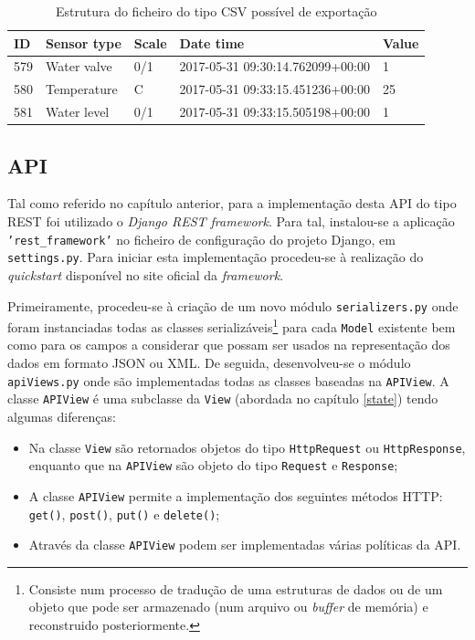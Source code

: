\begin{table}[h]
	\centering

	\begin{tabular}{|l|l|l|l|l|}
		\hline
		ID & Sensor type & Scale & Date time & Value \\ \hline
		579 & Water valve & 0/1 & 2017-05-31 09:30:14.762099+00:00 & 1 \\ \hline
		580 & Temperature & C & 2017-05-31 09:33:15.451236+00:00 & 25 \\ \hline
		581 & Water level & 0/1 & 2017-05-31 09:33:15.505198+00:00 & 1 \\ \hline
	\end{tabular}
	\caption{Estrutura do ficheiro do tipo \acs{CSV} possível de exportação}
	\label{exportcsv}
\end{table}




\subsection{API}


Tal como referido no capítulo anterior, para a implementação desta API do tipo REST foi utilizado o \textit{Django REST framework}. Para tal, instalou-se a aplicação \texttt{'rest\_framework'} no ficheiro de configuração do projeto Django, em \texttt{settings.py}. Para iniciar esta implementação procedeu-se à realização do \textit{quickstart} disponível no site oficial da \textit{framework}. 

Primeiramente, procedeu-se à criação de um novo módulo \texttt{serializers.py} onde foram instanciadas todas as classes serializáveis\footnote{Consiste num processo de tradução de uma estruturas de dados ou de um objeto que pode ser armazenado (num arquivo ou \textit{buffer} de memória) e reconstruido posteriormente.  } para cada \texttt{Model} existente bem como  para os campos a considerar que possam ser usados na representação dos dados em formato \ac{JSON} ou \ac{XML}. De seguida, desenvolveu-se o módulo \texttt{apiViews.py} onde são implementadas todas as classes baseadas na \texttt{APIView}. A classe \texttt{APIView} é uma subclasse da \texttt{View} (abordada no capítulo \ref{state}) tendo algumas diferenças: 

\begin{itemize}
	\item Na classe \texttt{View} são retornados objetos do tipo \texttt{HttpRequest} ou \texttt{HttpResponse}, enquanto que na \texttt{APIView} são objeto do tipo \texttt{Request} e \texttt{Response}; 
	\item A classe \texttt{APIView} permite a implementação dos seguintes métodos \ac{HTTP}: 	\texttt{get()}, \texttt{post()}, \texttt{put()} e \texttt{delete()}; 
	\item Através da classe  \texttt{APIView} podem ser implementadas várias políticas da \ac{API}. 
\end{itemize}

